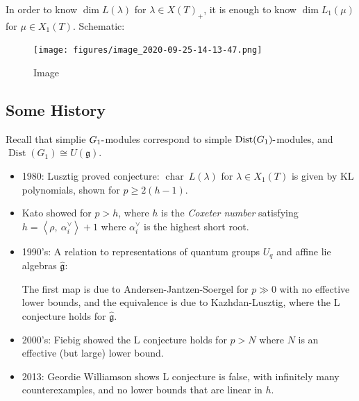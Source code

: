\begin{corollary}[?]

\begin{corollary}[?]

In order to know \(\dim L(\lambda)\) for \(\lambda \in X(T)_+\), it is
enough to know \(\dim L_1(\mu)\) for \(\mu \in X_1(T)\). Schematic:

\begin{figure}
\centering
\texttt{[image: figures/image\_2020-09-25-14-13-47.png]}
\caption{Image}
\end{figure}

\end{corollary}

\end{corollary}

\hypertarget{some-history}{%
\subsection{Some History}\label{some-history}}

Recall that simplie \(G_1{\hbox{-}}\)modules correspond to simple
\(\operatorname{Dist}(G_1){\hbox{-}}\)modules, and
\(\operatorname{Dist}(G_1) \cong U({\mathfrak{g}})\).

\begin{itemize}
\item
  1980: Lusztig proved conjecture: \(\operatorname{char}~L(\lambda)\)
  for \(\lambda \in X_1(T)\) is given by KL polynomials, shown for
  \(p \geq 2(h-1)\).
\item
  Kato showed for \(p> h\), where \(h\) is the \emph{Coxeter number}
  satisfying
  \(h = {\left\langle {\rho},~{\alpha_i ^\vee} \right\rangle} + 1\)
  where \(\alpha_i^\vee\) is the highest short root.
\item
  1990's: A relation to representations of quantum groups \(U_q\) and
  affine lie algebras \(\widehat{\mathfrak{g}}\):

  \begin{center}
  \end{center}

  The first map is due to Andersen-Jantzen-Soergel for \(p\gg 0\) with
  no effective lower bounds, and the equivalence is due to
  Kazhdan-Lusztig, where the L conjecture holds for
  \(\widehat{\mathfrak{g}}\).
\item
  2000's: Fiebig showed the L conjecture holds for \(p>N\) where \(N\)
  is an effective (but large) lower bound.
\item
  2013: Geordie Williamson shows L conjecture is false, with infinitely
  many counterexamples, and no lower bounds that are linear in \(h\).
\end{itemize}


